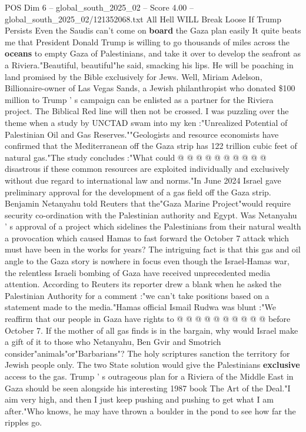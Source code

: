 \begin{textsample}{POS Dim 6 – global\_south\_2025\_02 – Score 4.00 – global\_south\_2025\_02/121352068.txt}  \label{ex:f6_pos_412}
All Hell WILL Break Loose If Trump Persists Even the Saudis can't come on \textbf{board} the Gaza plan easily It quite beats me that President Donald Trump is willing to go thousands of miles across the \textbf{oceans} to empty Gaza of Palestinians, and take it over to develop the seafront as a Riviera."Beautiful, beautiful"he said, smacking his lips.
He will be poaching in land promised by the Bible exclusively for Jews.
Well, Miriam Adelson, Billionaire-owner of Las Vegas Sands, a Jewish philanthropist who donated \$100 million to Trump ' s campaign can be enlisted as a partner for the Riviera project.
The Biblical Red line will then not be crossed.
I was puzzling over the theme when a study by UNCTAD swam into my ken :"Unrealized Potential of Palestinian Oil and Gas Reserves.""Geologists and resource economists have confirmed that the Mediterranean off the Gaza strip has 122 trillion cubic feet of natural gas."The study concludes :"What could @ @ @ @ @ @ @ @ @ @ disastrous if these common resources are exploited individually and exclusively without due regard to international law and norms."In June 2024 Israel gave preliminary approval for the development of a gas field off the Gaza strip.
Benjamin Netanyahu told Reuters that the"Gaza Marine Project"would require security co-ordination with the Palestinian authority and Egypt.
Was Netanyahu ' s approval of a project which sidelines the Palestinians from their natural wealth a provocation which caused Hamas to fast forward the October 7 attack which must have been in the works for years?
The intriguing fact is that this gas and oil angle to the Gaza story is nowhere in focus even though the Israel-Hamas war, the relentless Israeli bombing of Gaza have received unprecedented media attention.
According to Reuters its reporter drew a blank when he asked the Palestinian Authority for a comment :"we can't take positions based on a statement made to the media."Hamas official Ismail Rudwa was blunt :"We reaffirm that our people in Gaza have rights to @ @ @ @ @ @ @ @ @ @ before October 7.
If the mother of all gas finds is in the bargain, why would Israel make a gift of it to those who Netanyahu, Ben Gvir and Smotrich consider"animals"or"Barbarians"?
The holy scriptures sanction the territory for Jewish people only.
The two State solution would give the Palestinians \textbf{exclusive} access to the gas.
Trump ' s outrageous plan for a Riviera of the Middle East in Gaza should be seen alongside his interesting 1987 book The Art of the Deal."I aim very high, and then I just keep pushing and pushing to get what I am after."Who knows, he may have thrown a boulder in the pond to see how far the ripples go.

\end{textsample}
